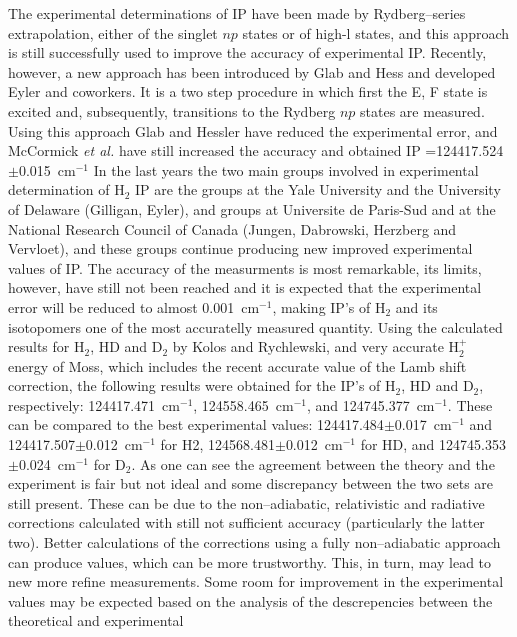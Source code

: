 The experimental determinations of IP have been made
by Rydberg--series extrapolation, either of the singlet
$np$ states or of high-l states, and this approach is still
successfully used to improve the accuracy of experimental IP.
Recently, however, a new approach has been introduced by Glab and
Hess\cite{k52} and developed  Eyler and coworkers.\cite{k53}
It is a two step procedure in which first the E, F state
is excited and, subsequently, transitions to the
Rydberg $np$ states are measured.  Using this approach Glab
and Hessler\cite{k52} have reduced the experimental error, and
McCormick {\it et al.}\cite{k53} have still increased the accuracy
and obtained IP =124417.524$\pm$0.015~cm$^{-1}$
In the last years the two main groups involved in experimental
determination of H$_2$ IP are the groups at the Yale University
and the University of Delaware (Gilligan, Eyler), and groups
at Universite de Paris-Sud and at the National Research Council
of Canada (Jungen, Dabrowski, Herzberg and Vervloet),\cite{k57}
and these groups continue producing new improved experimental
values of IP. The accuracy of the measurments is most remarkable, its
limits, however, have still not been reached and it is
expected\cite{k42p} that the experimental error will be reduced
to almost 0.001~cm$^{-1}$, making IP's of H$_2$ and its
isotopomers one of the most accuratelly measured quantity.
Using the  calculated
results for H$_2$, HD and D$_2$ by Kolos and Rychlewski,\cite{k12}
and very accurate H$_2^+$ energy of Moss,\cite{k58}
which includes the recent accurate value of the Lamb shift
correction,\cite{k59} the following results were obtained
for the IP's of H$_2$, HD and D$_2$, respectively:
124417.471~cm$^{-1}$, 124558.465~cm$^{-1}$, and 124745.377~cm$^{-1}$.
\cite{kk}
These can be compared to the best experimental values:
124417.484$\pm$0.017~cm$^{-1}$ and 124417.507$\pm$0.012~cm$^{-1}$
for H2,\cite{k42,k57} 124568.481$\pm$0.012~cm$^{-1}$ for HD,\cite{k42}
and 124745.353$\pm$0.024~cm$^{-1}$ for D$_2$.
As one can see the agreement between the theory and the
experiment is fair but not ideal and some discrepancy between
the two sets are still present. These can be due to the
non--adiabatic, relativistic and radiative corrections
calculated with still not sufficient accuracy (particularly the
latter two). Better calculations of the corrections using
a fully non--adiabatic approach can produce values, which can
be more trustworthy. This, in turn, may lead to new more refine
measurements.
Some room for improvement in the experimental
values may be expected based on the analysis
of the descrepencies between the theoretical and experimental
